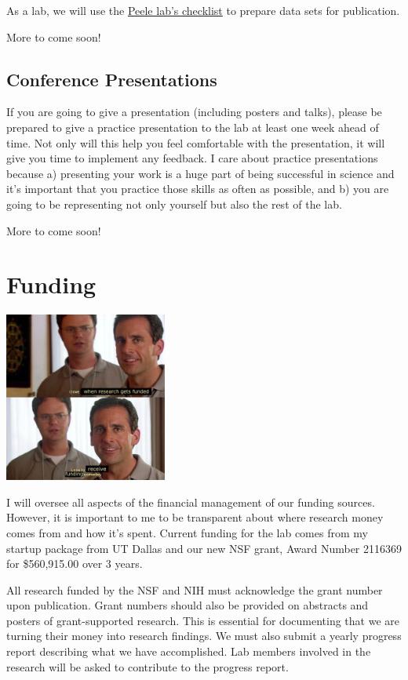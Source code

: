 \documentclass[
]{book}
\begin{document}
As a lab, we will use the \href{https://github.com/jpeelle/paperchecklist/blob/master/checklist.pdf}{Peele lab's checklist} to prepare data sets for publication.

More to come soon!

\hypertarget{conference-presentations}{%
\subsection{Conference Presentations}\label{conference-presentations}}

If you are going to give a presentation (including posters and talks), please be prepared to give a practice presentation to the lab at least one week ahead of time. Not only will this help you feel comfortable with the presentation, it will give you time to implement any feedback. I care about practice presentations because a) presenting your work is a huge part of being successful in science and it's important that you practice those skills as often as possible, and b) you are going to be representing not only yourself but also the rest of the lab.

More to come soon!

\hypertarget{funding}{%
\section{Funding}\label{funding}}

\includegraphics[width=0.4\textwidth,height=\textheight]{images/inside_joke_funding.jpg}

I will oversee all aspects of the financial management of our funding sources. However, it is important to me to be transparent about where research money comes from and how it's spent. Current funding for the lab comes from my startup package from UT Dallas and our new NSF grant, Award Number 2116369 for \$560,915.00 over 3 years.

All research funded by the NSF and NIH must acknowledge the grant number upon publication. Grant numbers should also be provided on abstracts and posters of grant-supported research. This is essential for documenting that we are turning their money into research findings. We must also submit a yearly progress report describing what we have accomplished. Lab members involved in the research will be asked to contribute to the progress report.
\end{document}
